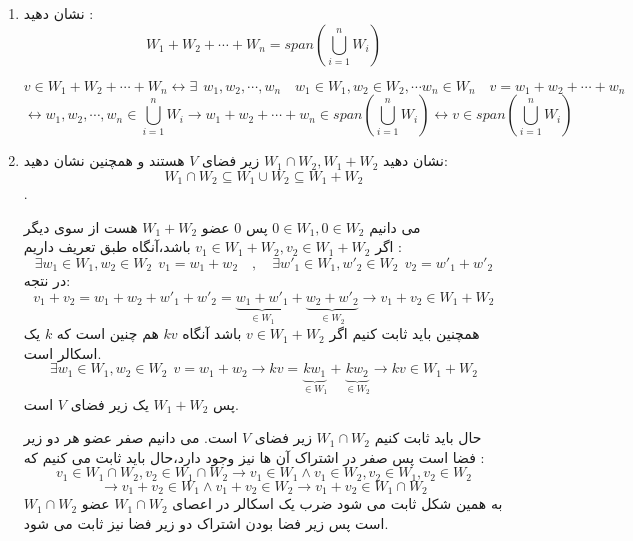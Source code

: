 \documentclass{article}
\begin{document}
\begin{enumerate}\item 
	نشان دهید :
	$$W_1+W_2+\cdots+W_n=span(\bigcup_{i=1}^{n}W_i)$$
	\begin{حل}
		$$v\in W_1+W_2+\cdots+W_n\longleftrightarrow \exists \ \ w_1,w_2,\cdots,w_n \quad w_1\in  W_1,w_2\in  W_2,\cdots w_n\in W_n \quad v=w_1+w_2+\cdots+w_n$$
		$$\longleftrightarrow w_1,w_2,\cdots,w_n\in\bigcup_{i=1}^{n}W_i\longrightarrow w_1+w_2+\cdots+w_n\in span(\bigcup_{i=1}^{n}W_i)\longleftrightarrow v\in span(\bigcup_{i=1}^{n}W_i) $$	
	\end{حل}
	\item 
	نشان دهید 
	$W_1\cap W_2,W_1+W_2$
	زیر فضای 
	$V$
	هستند و همچنین نشان دهید:
	$$W_1\cap W_2 \subseteq W_1\cup W_2\subseteq W_1+W_2$$.
	\begin{حل}
		می دانیم 
		$0\in W_1,0\in W_2$
		پس 0 عضو 
		$W_1+W_2$
		هست از سوی دیگر 
		\\
		اگر 
		$v_1\in W_1+W_2,v_2\in W_1+W_2$
		باشد،آنگاه طبق تعریف داریم :
		$$\exists w_1\in W_1,w_2\in W_2 \ \ v_1=w_1+w_2\quad,\quad \exists w'_1\in W_1,w'_2\in W_2 \ \ v_2=w'_1+w'_2$$
		در نتجه:
		$$v_1+v_2=w_1+w_2+w'_1+w'_2=\underbrace{w_1+w'_1}_{\in W_1}+\underbrace{w_2+w'_2}_{\in W_2}\longrightarrow v_1+v_2\in W_1+W_2$$
		همچنین باید ثابت کنیم اگر 
		$v\in W_1+W_2$
		باشد آنگاه 
		$kv$
		هم چنین است که 
		$k$
		یک اسکالر است.
		$$\exists w_1\in W_1,w_2\in W_2 \ \ v=w_1+w_2\longrightarrow kv=\underbrace{kw_1}_{\in W_1}+\underbrace{kw_2}_{\in W_2}\longrightarrow kv\in W_1+W_2$$
		پس 
		$W_1+W_2$
		یک زیر فضای 
		$V$
		است.
		
		حال باید ثابت کنیم 
		$W_1\cap W_2 $
		زیر فضای 
		$V$
		است. می دانیم صفر عضو هر دو زیر فضا است پس صفر در اشتراک آن ها نیز وجود دارد،حال باید ثابت می کنیم که :
		$$v_1\in W_1\cap W_2, v_2\in W_1\cap W_2\longrightarrow v_1\in W_1\wedge v_1\in W_2, v_2\in W_1,v_2\in W_2$$$$\longrightarrow v_1+v_2\in W_1\wedge v_1+v_2\in W_2\longrightarrow v_1+v_2\in W_1\cap W_2 $$
		به همین شکل ثابت می شود ضرب یک اسکالر در اعصای 
		$W_1\cap W_2$
		عضو 
		$W_1\cap W_2$
		است پس زیر فضا بودن اشتراک دو زیر فضا نیز ثابت می شود.
		

\end{حل}
\end{enumerate}
\end{document}
